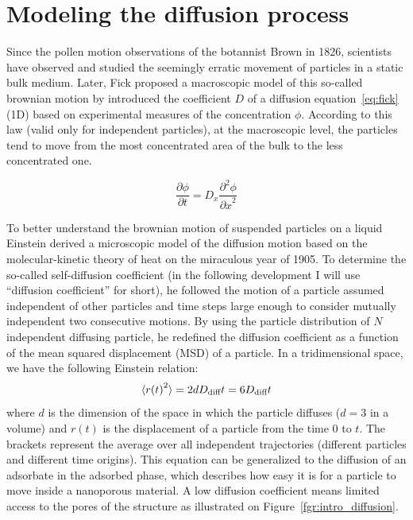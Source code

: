 \documentclass[main]{subfiles}
\begin{document}
\section{Modeling the diffusion process}

Since the pollen motion observations of the botannist Brown in 1826, scientists have observed and studied the seemingly erratic movement of particles in a static bulk medium. Later, Fick proposed a macroscopic model of this so-called brownian motion by introduced the coefficient $D$ of a diffusion equation~\ref{eq:fick} (1D) based on experimental measures of the concentration $\phi$.\autocite{Fick_1855} According to this law (valid only for independent particles), at the macroscopic level, the particles tend to move from the most concentrated area of the bulk to the less concentrated one. 

\begin{equation}\label{eq:fick}
  \frac{\partial \phi}{\partial t} = D_x \frac{\partial^2 \phi}{{\partial x}^2}
\end{equation}

To better understand the brownian motion of suspended particles on a liquid Einstein derived a microscopic model of the diffusion motion based on the molecular-kinetic theory of heat on the miraculous year of 1905.\autocite{einstein1905motion} To determine the so-called self-diffusion coefficient (in the following development I will use ``diffusion coefficient'' for short), he followed the motion of a particle assumed independent of other particles and time steps large enough to consider mutually independent two consecutive motions. By using the particle distribution of $N$ independent diffusing particle, he redefined the diffusion coefficient as a function of the mean squared displacement (MSD) of a particle. In a tridimensional space, we have the following Einstein relation:
\begin{equation}\label{eq:einstein}
  \langle {r(t)}^2 \rangle = 2dD_{\text{diff}}t = 6D_{\text{diff}}t
\end{equation}
where  $d$ is the dimension of the space in which the particle diffuses ($d=3$ in a volume) and $r(t)$ is the displacement of a particle from the time $0$ to $t$. The brackets represent the average over all independent trajectories (different particles and different time origins). This equation can be generalized to the diffusion of an adsorbate in the adsorbed phase, which describes how easy it is for a particle to move inside a nanoporous material. A low diffusion coefficient means limited access to the pores of the structure as illustrated on Figure~\ref{fgr:intro_diffusion}.
\end{document}
